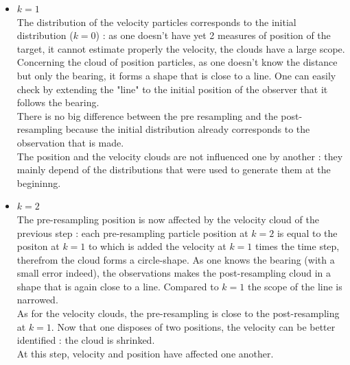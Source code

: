 \documentclass[english,DIV=13]{scrreprt}
\begin{document}
\begin{itemize}
\item $k=1$\\
The distribution of the velocity particles corresponds to the initial distribution ($k=0$) : as one doesn't have yet 2 measures 
of position of the target, it cannot estimate properly the velocity, the clouds have a large scope.\\
Concerning the cloud of position particles, as one doesn't know the distance but only the bearing, it forms a shape
that is close to a line. One can easily check by extending the "line" to the initial position of the observer that it 
follows the bearing.\\
There is no big difference between the pre resampling and the post-resampling because the initial distribution already corresponds
to the observation that is made.\\
The position and the velocity clouds are not influenced one by another : they mainly depend of the distributions that were
used to generate them at the begininng.

\item $k=2$\\
The pre-resampling position is now affected by the velocity cloud of the previous step : each pre-resampling particle position
at $k=2$ is equal to the positon at $k=1$ to which is added the velocity at $k=1$ times the time step, therefrom the cloud forms
a circle-shape. As one knows the bearing (with a small error indeed), the observations makes the post-resampling cloud
in a shape that is again close to a line. Compared to $k=1$ the scope of the line is narrowed. \\
As for the velocity clouds, the pre-resampling is close to the post-resampling at $k=1$. Now that one disposes of two positions,
the velocity can be better identified : the cloud is shrinked. \\
At this step, velocity and position have affected one another.







\end{itemize}
\end{document}
